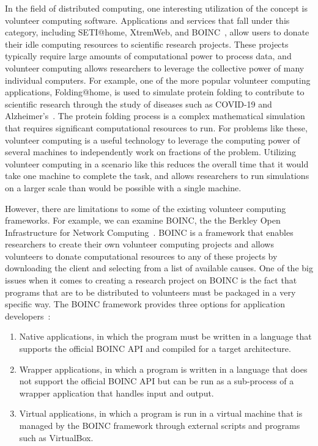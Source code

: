 \documentclass[11pt]{article}
\begin{document}
In the field of distributed computing, one interesting utilization of the concept is volunteer computing software. Applications and services that fall under this category, including SETI@home, XtremWeb, and BOINC~\cite{Mengistu2020}, allow users to donate their idle computing resources to scientific research projects. These projects typically require large amounts of computational power to process data, and volunteer computing allows researchers to leverage the collective power of many individual computers. For example, one of the more popular volunteer computing applications, Folding@home, is used to simulate protein folding to contribute to scientific research through the study of diseases such as COVID-19 and Alzheimer's~\cite{Voelz2023}. The protein folding process is a complex mathematical simulation that requires significant computational resources to run. For problems like these, volunteer computing is a useful technology to leverage the computing power of several machines to independently work on fractions of the problem. Utilizing volunteer computing in a scenario like this reduces the overall time that it would take one machine to complete the task, and allows researchers to run simulations on a larger scale than would be possible with a single machine.

However, there are limitations to some of the existing volunteer computing frameworks. For example, we can examine BOINC, the the Berkley Open Infrastructure for Network Computing~\cite{Anderson2020}. BOINC is a framework that enables researchers to create their own volunteer computing projects and allows volunteers to donate computational resources to any of these projects by downloading the client and selecting from a list of available causes. One of the big issues when it comes to creating a research project on BOINC is the fact that programs that are to be distributed to volunteers must be packaged in a very specific way. The BOINC framework provides three options for application developers~\cite{boincAppsIntro}:

\begin{enumerate}
    \item Native applications, in which the program must be written in a language that supports the official BOINC API and compiled for a target architecture.
    \item Wrapper applications, in which a program is written in a language that does not support the official BOINC API but can be run as a sub-process of a wrapper application that handles input and output.
    \item Virtual applications, in which a program is run in a virtual machine that is managed by the BOINC framework through external scripts and programs such as VirtualBox.
\end{enumerate}
\end{document}
